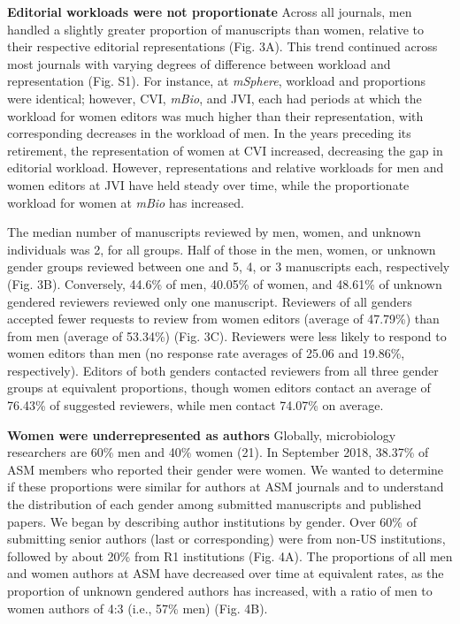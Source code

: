 \documentclass[11pt,]{article}
\begin{document}
\textbf{Editorial workloads were not proportionate} Across all journals,
men handled a slightly greater proportion of manuscripts than women,
relative to their respective editorial representations (Fig. 3A). This
trend continued across most journals with varying degrees of difference
between workload and representation (Fig. S1). For instance, at
\emph{mSphere}, workload and proportions were identical; however, CVI,
\emph{mBio}, and JVI, each had periods at which the workload for women
editors was much higher than their representation, with corresponding
decreases in the workload of men. In the years preceding its retirement,
the representation of women at CVI increased, decreasing the gap in
editorial workload. However, representations and relative workloads for
men and women editors at JVI have held steady over time, while the
proportionate workload for women at \emph{mBio} has increased.

The median number of manuscripts reviewed by men, women, and unknown
individuals was 2, for all groups. Half of those in the men, women, or
unknown gender groups reviewed between one and 5, 4, or 3 manuscripts
each, respectively (Fig. 3B). Conversely, 44.6\% of men, 40.05\% of
women, and 48.61\% of unknown gendered reviewers reviewed only one
manuscript. Reviewers of all genders accepted fewer requests to review
from women editors (average of 47.79\%) than from men (average of
53.34\%) (Fig. 3C). Reviewers were less likely to respond to women
editors than men (no response rate averages of 25.06 and 19.86\%,
respectively). Editors of both genders contacted reviewers from all
three gender groups at equivalent proportions, though women editors
contact an average of 76.43\% of suggested reviewers, while men contact
74.07\% on average.

\textbf{Women were underrepresented as authors} Globally, microbiology
researchers are 60\% men and 40\% women (21). In September 2018, 38.37\%
of ASM members who reported their gender were women. We wanted to
determine if these proportions were similar for authors at ASM journals
and to understand the distribution of each gender among submitted
manuscripts and published papers. We began by describing author
institutions by gender. Over 60\% of submitting senior authors (last or
corresponding) were from non-US institutions, followed by about 20\%
from R1 institutions (Fig. 4A). The proportions of all men and women
authors at ASM have decreased over time at equivalent rates, as the
proportion of unknown gendered authors has increased, with a ratio of
men to women authors of 4:3 (i.e., 57\% men) (Fig. 4B).
\end{document}
